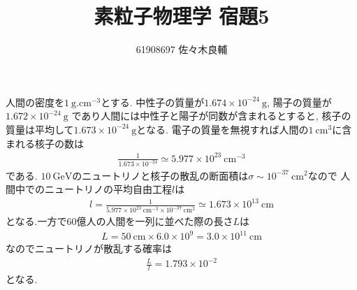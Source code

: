 \documentclass[uplatex,a4j,11pt,dvipdfmx]{jsarticle}
\begin{document}
\title{素粒子物理学 宿題5}
\author{61908697 佐々木良輔}
\date{}
\maketitle
人間の密度を$1\ \si{\gram.\centi\metre^{-3}}$とする.
中性子の質量が$1.674\times10^{-24}\ \si{\gram}$,
陽子の質量が$1.672\times10^{-24}\ \si{\gram}$
であり人間には中性子と陽子が同数が含まれるとすると,
核子の質量は平均して$1.673\times10^{-24}\ \si{\gram}$となる.\cite{n:online}\cite{p:online}
電子の質量を無視すれば人間の$1\ \si{\centi\metre^3}$に含まれる核子の数は
\begin{align*}
  \frac{1}{1.673\times10^{-24}}\simeq5.977\times10^{23}\ \si{\centi\metre^{-3}}
\end{align*}
である.
$10\ \si{\giga\electronvolt}$のニュートリノと核子の散乱の断面積は$\sigma\sim10^{-37}\ \si{\centi\metre^2}$なので
人間中でのニュートリノの平均自由工程$l$は
\begin{align*}
  l=\frac{1}{5.977\times10^{23}\ \si{\centi\metre^{-3}}\times10^{-37}\ \si{\centi\metre^2}}\simeq1.673\times10^{13}\ \si{\centi\metre}
\end{align*}
となる.一方で60億人の人間を一列に並べた際の長さ$L$は
\begin{align*}
  L=50\ \si{\centi\metre}\times6.0\times10^9=3.0\times10^{11}\ \si{\centi\metre}
\end{align*}
なのでニュートリノが散乱する確率は
\begin{align*}
\frac{L}{l}=1.793\times10^{-2}
\end{align*}
となる.

\end{document}
